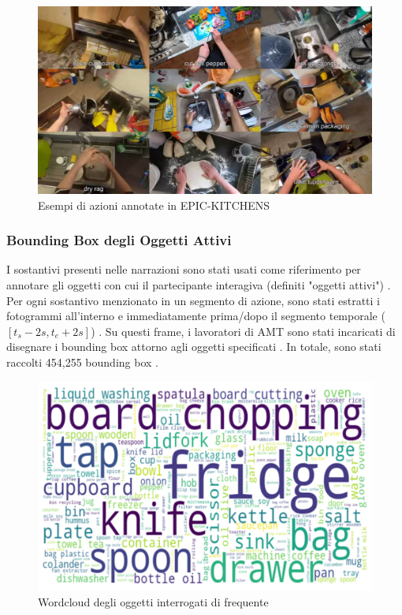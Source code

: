 \begin{figure}[ht]
    \centering
    \includegraphics[width=0.8\linewidth]{Images/epic_ex.png}
    \caption{Esempi di azioni annotate in EPIC-KITCHENS}
    \label{fig:amb_stats2}
\end{figure}

\subsubsection* {Bounding Box degli Oggetti Attivi}
I sostantivi presenti nelle narrazioni sono stati usati come riferimento per annotare gli oggetti con cui il partecipante interagiva (definiti "oggetti attivi") \cite{Damen2021PAMI}. Per ogni sostantivo menzionato in un segmento di azione, sono stati estratti i fotogrammi all'interno e immediatamente prima/dopo il segmento temporale ($[t_s - 2s, t_e + 2s]$) \cite{Damen2021PAMI}. Su questi frame, i lavoratori di AMT sono stati incaricati di disegnare i bounding box attorno agli oggetti specificati \cite{Damen2021PAMI}. In totale, sono stati raccolti 454,255 bounding box \cite{Damen2021PAMI}.

\begin{figure}[ht]
    \centering
    \includegraphics[width=0.6\linewidth]{Images/epic_cloud.png}
    \caption{Wordcloud degli oggetti interrogati di frequente}
    \label{fig:amb_stats1}
\end{figure}

